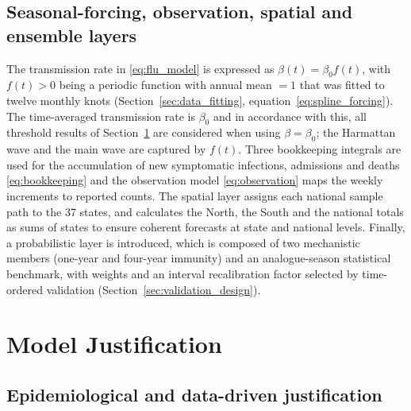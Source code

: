\documentclass[12pt,a4paper]{article}
\theoremstyle{definition}
\theoremstyle{remark}
\begin{document}
\subsection{Seasonal-forcing, observation, spatial and ensemble layers}\label{sec:architecture_layers}

The transmission rate in \eqref{eq:flu_model} is expressed as $\beta(t)=\beta_0 f(t)$, with $f(t)>0$ being a periodic function with annual mean $=1$ that was fitted to twelve monthly knots (Section~\ref{sec:data_fitting}, equation~\eqref{eq:spline_forcing}). The time-averaged transmission rate is $\beta_0$ and in accordance with this, all threshold results of Section~\ref{sec:justification} are considered when using $\beta=\beta_0$; the Harmattan wave and the main wave are captured by $f(t)$. Three bookkeeping integrals are used for the accumulation of new symptomatic infections, admissions and deaths \eqref{eq:bookkeeping} and the observation model \eqref{eq:observation} maps the weekly increments to reported counts. The spatial layer assigns each national sample path to the 37 states, and calculates the North, the South and the national totals as sums of states to ensure coherent forecasts at state and national levels. Finally, a probabilistic layer is introduced, which is composed of two mechanistic members (one-year and four-year immunity) and an analogue-season statistical benchmark, with weights and an interval recalibration factor selected by time-ordered validation (Section~\ref{sec:validation_design}).

\section{Model Justification}\label{sec:justification}

\subsection{Epidemiological and data-driven justification}
\end{document}
